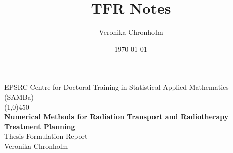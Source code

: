 \documentclass{article}  %
\title{TFR Notes}
\author{Veronika Chronholm}
\date{\today}
\begin{document}
\setcounter{secnumdepth}{2}
\pagestyle{plain} %

\begin{center}
    \large{EPSRC Centre for Doctoral Training in Statistical Applied Mathematics (SAMBa)} \\
	\line(1,0){450}\\ 
	\vspace{3.5cm} 
	{ \huge \textbf{Numerical Methods for Radiation Transport and Radiotherapy Treatment Planning} \\}
    \vspace{1.5cm} 
    \Large{Thesis Formulation Report} \\
    \vspace*{9cm}
    Veronika Chronholm
\end{center}

\thispagestyle{empty}

\newpage
\tableofcontents
\setcounter{page}{1}

\newpage
\end{document}
